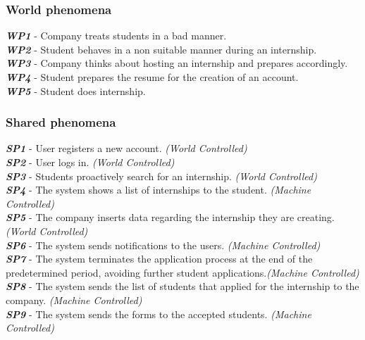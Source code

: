 \documentclass[11pt,twoside]{article}
\begin{document}
		\subsubsection{World phenomena}
\begin{spacing}{1.5}
\textbf{\textit{WP1}} - Company treats students in a bad manner. \\
\textbf{\textit{WP2}} - Student behaves in a non suitable manner during an internship. \\
\textbf{\textit{WP3}} - Company thinks about hosting an internship and prepares accordingly. \\
\textbf{\textit{WP4}} - Student prepares the resume for the creation of an account. \\
\textbf{\textit{WP5}} - Student does internship.
\end{spacing}
		\subsubsection{Shared phenomena}
\begin{spacing}{1.5}
\textbf{\textit{SP1}} - User registers a new account. \textit{(World Controlled)} \\
\textbf{\textit{SP2}} - User logs in. \textit{(World Controlled)} \\
\textbf{\textit{SP3}} - Students proactively search for an internship. \textit{(World Controlled)}\\
\textbf{\textit{SP4}} - The system shows a list of internships to the student. \textit{(Machine Controlled)} \\
\textbf{\textit{SP5}} - The company inserts data regarding the internship they are creating. \textit{(World Controlled)} \\
\textbf{\textit{SP6}} - The system sends notifications to the users. \textit{(Machine Controlled)} \\
\textbf{\textit{SP7}} - The system terminates the application process at the end of the predetermined period, avoiding further student applications.\textit{(Machine Controlled)} \\
\textbf{\textit{SP8}} - The system sends the list of students that applied for the internship to the company. \textit{(Machine Controlled)} \\
\textbf{\textit{SP9}} - The system sends the forms to the accepted students. \textit{(Machine Controlled)}
\end{spacing}
\end{document}
